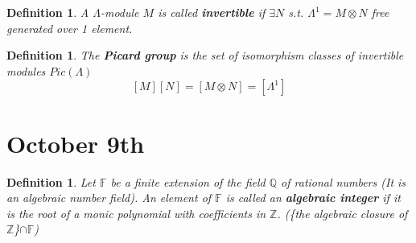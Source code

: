 \documentclass[11pt]{article}
\newtheorem{dfn}[thm]{Definition}
\newcommand{\intg}{\mathbb Z}
\newcommand{\bbf}{\mathbb F}
\newcommand{\ratl}{\mathbb Q}
\begin{document}
\begin{dfn}
A $\Lambda$-module $M$ is called \textbf{invertible} if $\exists N$ s.t. $\Lambda^1=M\otimes N$ free generated over 1 element.
\end{dfn}

\begin{dfn}The \textbf{Picard group} is the set of  isomorphism classes of invertible modules
$Pic(\Lambda)$
$$
[M][N]=[M\otimes N]=[\Lambda^1]
$$
\end{dfn}


\section{October 9th}
\begin{dfn}
Let $\bbf$ be a finite extension of the field $\ratl$ of rational numbers (It is an algebraic number field). An element of $\bbf$ is called an \textbf{algebraic integer} if  it is the root of a monic polynomial with coefficients  in $\intg$. (\{the algebraic closure of $\intg$\}$\cap\bbf$)
\end{dfn}
\end{document}
